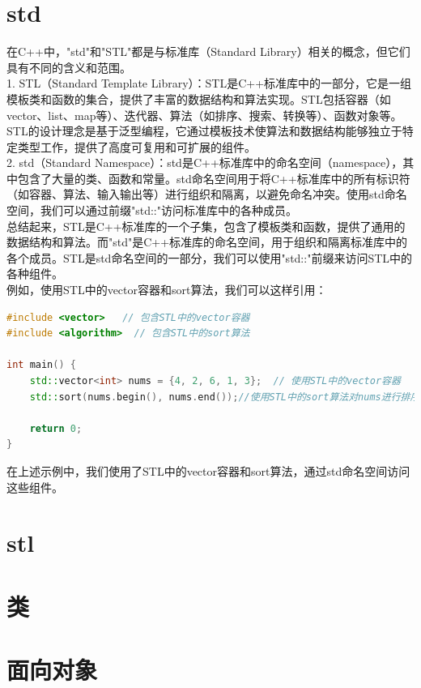 \documentclass[12pt,twiside,a4paper]{ctexbook}
\numberwithin{chapter}{part}
\begin{document}
\chapter{std}
在C++中，"std"和"STL"都是与标准库（Standard Library）相关的概念，但它们具有不同的含义和范围。\\
1. STL（Standard Template Library）：STL是C++标准库中的一部分，它是一组模板类和函数的集合，提供了丰富的数据结构和算法实现。STL包括容器（如vector、list、map等）、迭代器、算法（如排序、搜索、转换等）、函数对象等。STL的设计理念是基于泛型编程，它通过模板技术使算法和数据结构能够独立于特定类型工作，提供了高度可复用和可扩展的组件。\\
2. std（Standard Namespace）：std是C++标准库中的命名空间（namespace），其中包含了大量的类、函数和常量。std命名空间用于将C++标准库中的所有标识符（如容器、算法、输入输出等）进行组织和隔离，以避免命名冲突。使用std命名空间，我们可以通过前缀"std::"访问标准库中的各种成员。\\
总结起来，STL是C++标准库的一个子集，包含了模板类和函数，提供了通用的数据结构和算法。而"std"是C++标准库的命名空间，用于组织和隔离标准库中的各个成员。STL是std命名空间的一部分，我们可以使用"std::"前缀来访问STL中的各种组件。\\
例如，使用STL中的vector容器和sort算法，我们可以这样引用：\\
\begin{lstlisting}[language=C++]
#include <vector>   // 包含STL中的vector容器
#include <algorithm>  // 包含STL中的sort算法

int main() {
    std::vector<int> nums = {4, 2, 6, 1, 3};  // 使用STL中的vector容器
    std::sort(nums.begin(), nums.end());//使用STL中的sort算法对nums进行排序

    return 0;
}
\end{lstlisting}
在上述示例中，我们使用了STL中的vector容器和sort算法，通过std命名空间访问这些组件。

\chapter{stl}

\chapter{类}

\chapter{面向对象}
\end{document}
